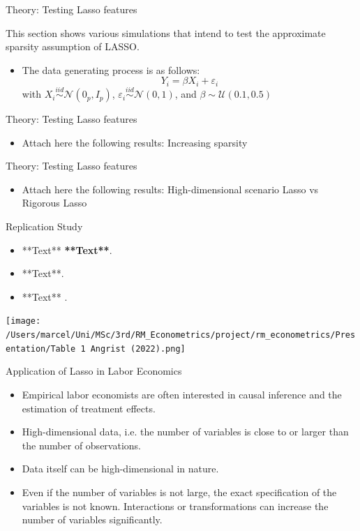 \documentclass[serif,professionalfont]{beamer}
\begin{document}
\begin{frame}{Theory: Testing Lasso features}
\begin{flushleft}
This section shows various simulations that intend to test the approximate sparsity assumption of LASSO.
\end{flushleft}
	\begin{itemize}
		\item The data generating process is as follows:
		\[Y_i = \beta X_i + \varepsilon_i\]
		with \(X_i \stackrel{iid}{\sim} \mathcal{N}(0_p,I_p)\), \(\varepsilon_i \stackrel{iid}{\sim} \mathcal{N}(0,1)\), and \(\beta  {\sim}  \mathcal{U}(0.1,0.5)\) 
	\end{itemize}
\end{frame}


\begin{frame}{Theory: Testing Lasso features}
	\begin{itemize}
		\item Attach here the following results: Increasing sparsity
	\end{itemize}
\end{frame}



\begin{frame}{Theory: Testing Lasso features}
	\begin{itemize}
		\item Attach here the following results: High-dimensional scenario Lasso vs Rigorous Lasso
	\end{itemize}
\end{frame}


\begin{frame}{Replication Study}
\begin{itemize}
  
\item **Text** \textbf{**Text**}.
\item **Text**. 
\item **Text** .
\end{itemize}

\texttt{[image: /Users/marcel/Uni/MSc/3rd/RM\_Econometrics/project/rm\_econometrics/Presentation/Table 1 Angrist (2022).png]}
\end{frame}

\begin{frame}{Application of Lasso in Labor Economics}
\begin{itemize}
	\item Empirical labor economists are often interested in causal inference and the estimation of treatment effects.
	\item High-dimensional data, i.e. the number of variables is close to or larger than the number of observations.
	\item Data itself can be high-dimensional in nature.
	\item Even if the number of variables is not large, the exact specification of the variables is not known. Interactions or transformations can increase the number of variables significantly.
\end{itemize}	
\end{frame}
\end{document}
